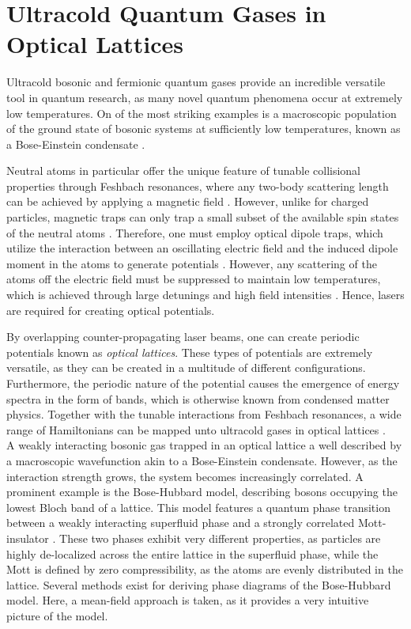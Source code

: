 \chapter{Ultracold Quantum Gases in Optical Lattices}

Ultracold bosonic and fermionic quantum gases provide an incredible versatile tool in quantum research, as many novel quantum phenomena occur at extremely low temperatures. On of the most striking examples is a macroscopic population of the ground state of bosonic systems at sufficiently low temperatures, known as a Bose-Einstein condensate \cite{WiemanCornell1995}.

Neutral atoms in particular offer the unique feature of tunable collisional properties through Feshbach resonances, where any two-body scattering length can be achieved by applying a magnetic field \cite{Inouye1998,Zwierlein2004}. However, unlike for charged particles, magnetic traps can only trap a small subset of the available spin states of the neutral atoms \cite{Bloch2005}. Therefore, one must employ optical dipole traps, which utilize the interaction between an oscillating electric field and the induced dipole moment in the atoms to generate potentials \cite{grimm}. However, any scattering of the atoms off the electric field must be suppressed to maintain low temperatures, which is achieved through large detunings and high field intensities \cite{manybodyBloch}. Hence, lasers are required for creating optical potentials.

By overlapping counter-propagating laser beams, one can create periodic potentials known as \textit{optical lattices}. These types of potentials are extremely versatile, as they can be created in a multitude of different configurations. Furthermore, the periodic nature of the potential causes the emergence of energy spectra in the form of bands, which is otherwise known from condensed matter physics. Together with the tunable interactions from Feshbach resonances, a wide range of Hamiltonians can be mapped unto ultracold gases in optical lattices \cite{JakschZoller, Bloch2012}.\\

A weakly interacting bosonic gas trapped in an optical lattice a well described by a macroscopic wavefunction akin to a Bose-Einstein condensate. However, as the interaction strength grows, the system becomes increasingly correlated. A prominent example is the Bose-Hubbard model, describing bosons occupying the lowest Bloch band of a lattice. This model features a quantum phase transition between a weakly interacting superfluid phase and a strongly correlated Mott-insulator \cite{Fisher1989}. These two phases exhibit very different properties, as  particles are highly de-localized across the entire lattice in the superfluid phase, while the Mott is defined by zero compressibility, as the atoms are evenly distributed in the lattice. Several methods exist for deriving phase diagrams of the Bose-Hubbard model. Here, a mean-field approach is taken, as it provides a very intuitive picture of the model.


